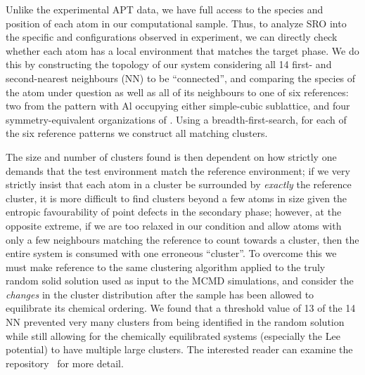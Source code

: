 Unlike the experimental APT data, we have full access to the species and position of each atom in our computational sample.
Thus, to analyze SRO into the specific \DOTHREE and \BTWO configurations observed in experiment, we can directly check whether each atom has a local environment that matches the target phase.
We do this by constructing the topology of our system considering all 14 first- and second-nearest neighbours (NN) to be ``connected'', and comparing the species of the atom under question as well as all of its neighbours to one of six references: two from the \BTWO pattern with Al occupying either simple-cubic sublattice, and four symmetry-equivalent organizations of \DOTHREE.
Using a breadth-first-search, for each of the six reference patterns we construct all matching clusters.

The size and number of clusters found is then dependent on how strictly one demands that the test environment match the reference environment;
if we very strictly insist that each atom in a cluster be surrounded by \emph{exactly} the reference cluster, it is more difficult to find clusters beyond a few atoms in size given the entropic favourability of point defects in the secondary phase;
however, at the opposite extreme, if we are too relaxed in our condition and allow atoms with only a few neighbours matching the reference to count towards a cluster, then the entire system is consumed with one erroneous ``cluster''.
To overcome this we must make reference to the same clustering algorithm applied to the truly random solid solution used as input to the MCMD simulations, and consider the \emph{changes} in the cluster distribution after the sample has been allowed to equilibrate its chemical ordering.
We found that a threshold value of 13 of the 14 NN prevented very many clusters from being identified in the random solution while still allowing for the chemically equilibrated systems (especially the Lee potential) to have multiple large clusters.
The interested reader can examine the  repository~\cite{feal} for more detail.

